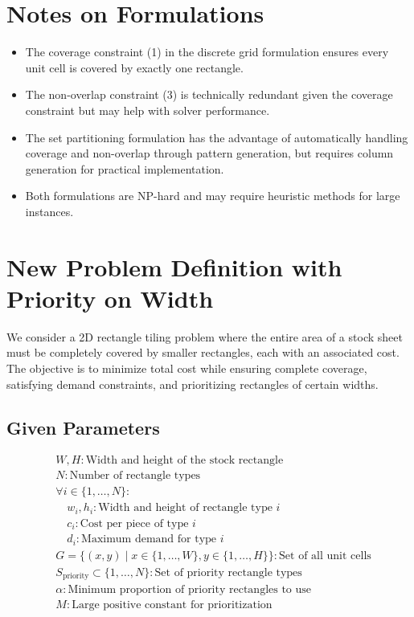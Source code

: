 \documentclass{article}
\begin{document}
\section{Notes on Formulations}

\begin{itemize}
\item The coverage constraint (1) in the discrete grid formulation ensures every unit cell is covered by exactly one rectangle.
\item The non-overlap constraint (3) is technically redundant given the coverage constraint but may help with solver performance.
\item The set partitioning formulation has the advantage of automatically handling coverage and non-overlap through pattern generation, but requires column generation for practical implementation.
\item Both formulations are NP-hard and may require heuristic methods for large instances.
\end{itemize}

\section{New Problem Definition with Priority on Width}

We consider a 2D rectangle tiling problem where the entire area of a stock sheet must be completely covered by smaller rectangles, each with an associated cost. The objective is to minimize total cost while ensuring complete coverage, satisfying demand constraints, and prioritizing rectangles of certain widths.

\subsection{Given Parameters}
\begin{align*}
& W, H: \text{Width and height of the stock rectangle} \\
& N: \text{Number of rectangle types} \\
& \forall i \in \{1, \ldots, N\}: \\
& \quad w_i, h_i: \text{Width and height of rectangle type } i \\
& \quad c_i: \text{Cost per piece of type } i \\
& \quad d_i: \text{Maximum demand for type } i \\
& G = \{(x,y) \mid x \in \{1,\ldots,W\}, y \in \{1,\ldots,H\}\}: \text{Set of all unit cells} \\
& S_{\text{priority}} \subset \{1,\ldots,N\}: \text{Set of priority rectangle types} \\
& \alpha: \text{Minimum proportion of priority rectangles to use} \\
& M: \text{Large positive constant for prioritization}
\end{align*}
\end{document}
